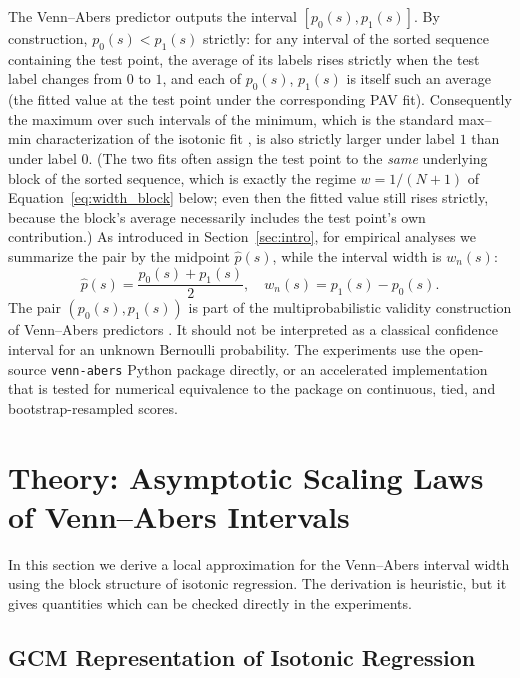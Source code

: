 \documentclass[11pt]{article}
\begin{document}
	The Venn--Abers predictor outputs the interval $[p_0(s), p_1(s)]$. By construction, $p_0(s) < p_1(s)$ strictly: for any interval of the sorted sequence containing the test point, the average of its labels rises strictly when the test label changes from $0$ to $1$, and each of $p_0(s)$, $p_1(s)$ is itself such an average (the fitted value at the test point under the corresponding PAV fit). Consequently the maximum over such intervals of the minimum, which is the standard max--min characterization of the isotonic fit \cite{robertson1988}, is also strictly larger under label $1$ than under label $0$. (The two fits often assign the test point to the \emph{same} underlying block of the sorted sequence, which is exactly the regime $w=1/(N+1)$ of Equation~\ref{eq:width_block} below; even then the fitted value still rises strictly, because the block's average necessarily includes the test point's own contribution.) As introduced in Section~\ref{sec:intro}, for empirical analyses we summarize the pair by the midpoint $\hat{p}(s)$, while the interval width is $w_n(s)$:
	\begin{equation}
		\hat{p}(s) = \frac{p_0(s) + p_1(s)}{2}, \quad w_n(s) = p_1(s) - p_0(s).
	\end{equation}
	The pair $(p_0(s), p_1(s))$ is part of the multiprobabilistic validity construction of Venn--Abers predictors \cite{vovk2015}. It should not be interpreted as a classical confidence interval for an unknown Bernoulli probability. The experiments use the open-source \texttt{venn-abers} Python package \cite{vennaberspkg} directly, or an accelerated implementation that is tested for numerical equivalence to the package on continuous, tied, and bootstrap-resampled scores.
	
	\section{Theory: Asymptotic Scaling Laws of Venn--Abers Intervals}
	\label{sec:theory}
	
	In this section we derive a local approximation for the Venn--Abers interval width using the block structure of isotonic regression. The derivation is heuristic, but it gives quantities which can be checked directly in the experiments.
	
	\subsection{GCM Representation of Isotonic Regression}
	
\end{document}

